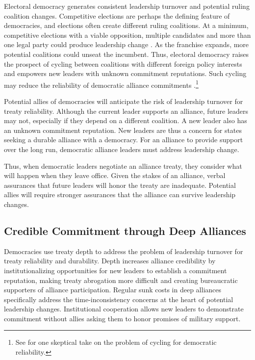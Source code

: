 \documentclass[12pt]{article}
\begin{document}
Electoral democracy generates consistent leadership turnover and potential ruling coalition changes. 
Competitive elections are perhaps the defining feature of democracies, and elections often create different ruling coalitions. 
At a minimum, competitive elections with a viable opposition, multiple candidates and more than one legal party could produce leadership change \citep{HydeMarinov2012}. 
As the franchise expands, more potential coalitions could unseat the incumbent.  
Thus, electoral democracy raises the prospect of cycling between coalitions with different foreign policy interests and empowers new leaders with unknown commitment reputations.
Such cycling may reduce the reliability of democratic alliance commitments \citep{GartzkeGleditsch2004}.\footnote{See \citet{Gaubatz1996} for one skeptical take on the problem of cycling for democratic reliability.}


Potential allies of democracies will anticipate the risk of leadership turnover for treaty reliability. 
Although the current leader supports an alliance, future leaders may not, especially if they depend on a different coalition. 
A new leader also has an unknown commitment reputation.
New leaders are thus a concern for states seeking a durable alliance with a democracy. 
For an alliance to provide support over the long run, democratic alliance leaders must address leadership change.


Thus, when democratic leaders negotiate an alliance treaty, they consider what will happen when they leave office.
Given the stakes of an alliance, verbal assurances that future leaders will honor the treaty are inadequate.
Potential allies will require stronger assurances that the alliance can survive leadership changes. 


\subsection{Credible Commitment through Deep Alliances}


Democracies use treaty depth to address the problem of leadership turnover for treaty reliability and durability. 
Depth increases alliance credibility by institutionalizing opportunities for new leaders to establish a commitment reputation, making treaty abrogation more difficult and creating bureaucratic supporters of alliance participation. 
Regular sunk costs in deep alliances specifically address the time-inconsistency concerns at the heart of potential leadership changes.
Institutional cooperation allows new leaders to demonstrate commitment without allies asking them to honor promises of military support.
\end{document}
